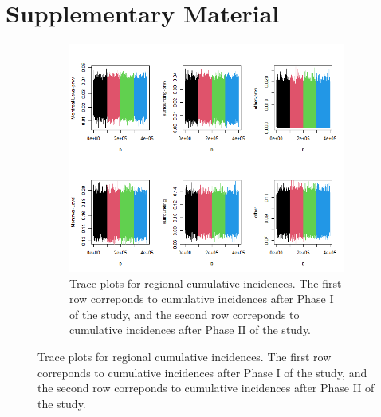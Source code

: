 \section{Supplementary Material}
\captionsetup[subfigure]{labelformat=empty}
\begin{figure}[ht!]
\centering
\begin{subfigure}[b]{\columnwidth} 
    \includegraphics[width=\columnwidth]{../../plot/trace_regional.png}
    \caption{Trace plots for regional cumulative incidences. The first row correponds to cumulative incidences after Phase I of the study, and the second row correponds to cumulative incidences after Phase II of the study.}
    \label{fig:local_trace}
\end{subfigure}
\end{figure}


